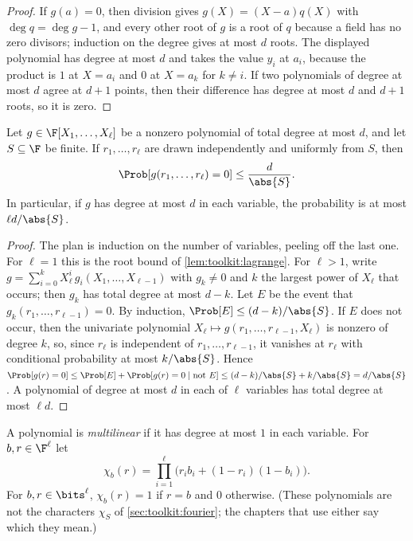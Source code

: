 \begin{refsection}
\begin{proof}
If $g(a)=0$, then division gives $g(X)=(X-a)q(X)$ with $\deg q=\deg g-1$, and every other root of $g$ is a root of $q$ because a field has no zero divisors; induction on the degree gives at most $d$ roots. The displayed polynomial has degree at most $d$ and takes the value $y_i$ at $a_i$, because the product is $1$ at $X=a_i$ and $0$ at $X=a_k$ for $k\ne i$. If two polynomials of degree at most $d$ agree at $d+1$ points, then their difference has degree at most $d$ and $d+1$ roots, so it is zero.
\end{proof}

\begin{lemma}\label{lem:toolkit:schwartzzippel}
Let $g\in\F[X_1,\dots,X_\ell]$ be a nonzero polynomial of total degree at most $d$, and let $S\subseteq\F$ be finite. If $r_1,\dots,r_\ell$ are drawn independently and uniformly from $S$, then
\[
\Prob[g(r_1,\dots,r_\ell)=0]\le\frac{d}{\abs{S}}.
\]
In particular, if $g$ has degree at most $d$ in each variable, the probability is at most $\ell d/\abs{S}$.
\end{lemma}

\begin{proof}
The plan is induction on the number of variables, peeling off the last one. For $\ell=1$ this is the root bound of \cref{lem:toolkit:lagrange}. For $\ell>1$, write $g=\sum_{i=0}^kX_\ell^i\,g_i(X_1,\dots,X_{\ell-1})$ with $g_k\ne0$ and $k$ the largest power of $X_\ell$ that occurs; then $g_k$ has total degree at most $d-k$. Let $E$ be the event that $g_k(r_1,\dots,r_{\ell-1})=0$. By induction, $\Prob[E]\le(d-k)/\abs{S}$. If $E$ does not occur, then the univariate polynomial $X_\ell\mapsto g(r_1,\dots,r_{\ell-1},X_\ell)$ is nonzero of degree $k$, so, since $r_\ell$ is independent of $r_1,\dots,r_{\ell-1}$, it vanishes at $r_\ell$ with conditional probability at most $k/\abs{S}$. Hence $\Prob[g(r)=0]\le\Prob[E]+\Prob[g(r)=0\mid\text{not }E]\le(d-k)/\abs{S}+k/\abs{S}=d/\abs{S}$. A polynomial of degree at most $d$ in each of $\ell$ variables has total degree at most $\ell d$.
\end{proof}

A polynomial is \emph{multilinear} if it has degree at most $1$ in each variable. For $b,r\in\F^\ell$ let
\begin{equation}\label{eq:toolkit:eq}
\chi_b(r)=\prod_{i=1}^\ell\bigl(r_ib_i+(1-r_i)(1-b_i)\bigr).
\end{equation}
For $b,r\in\bits^\ell$, $\chi_b(r)=1$ if $r=b$ and $0$ otherwise. (These polynomials are not the characters $\chi_S$ of \cref{sec:toolkit:fourier}; the chapters that use either say which they mean.)


\end{refsection}
